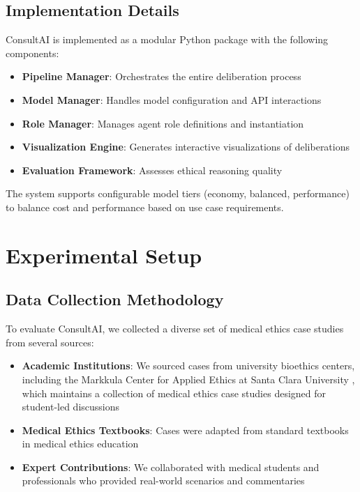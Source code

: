 \documentclass[11pt]{article}
\begin{document}
\subsection{Implementation Details}

ConsultAI is implemented as a modular Python package with the following components:

\begin{itemize}
    \item \textbf{Pipeline Manager}: Orchestrates the entire deliberation process
    \item \textbf{Model Manager}: Handles model configuration and API interactions
    \item \textbf{Role Manager}: Manages agent role definitions and instantiation
    \item \textbf{Visualization Engine}: Generates interactive visualizations of deliberations
    \item \textbf{Evaluation Framework}: Assesses ethical reasoning quality
\end{itemize}

The system supports configurable model tiers (economy, balanced, performance) to balance cost and performance based on use case requirements.

\section{Experimental Setup}

\subsection{Data Collection Methodology}

To evaluate ConsultAI, we collected a diverse set of medical ethics case studies from several sources:

\begin{itemize}
    \item \textbf{Academic Institutions}: We sourced cases from university bioethics centers, including the Markkula Center for Applied Ethics at Santa Clara University \cite{scu_ethics}, which maintains a collection of medical ethics case studies designed for student-led discussions
    \item \textbf{Medical Ethics Textbooks}: Cases were adapted from standard textbooks in medical ethics education
    \item \textbf{Expert Contributions}: We collaborated with medical students and professionals who provided real-world scenarios and commentaries
\end{itemize}
\end{document}
